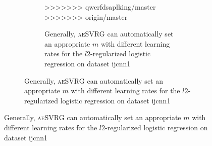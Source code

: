 \documentclass[conference]{IEEEtran}
\begin{document}
\begin{algorithm}[t]
\begin{itemize}
\begin{figure}[ht]
\begin{figure}[ht]
\begin{figure}[ht]
>>>>>>> qwerfdsaplking/master
>>>>>>> origin/master
\centering
{}

\caption{Generally, \textsc{aeSVRG} can automatically set an appropriate $m$ with different learning rates for the $l2$-regularized logistic regression on dataset ijcnn1}
\label{figure_logistic_ijcnn1}
\end{figure}


\end{figure}
\end{figure}
\end{itemize}
\end{algorithm}
\end{document}
